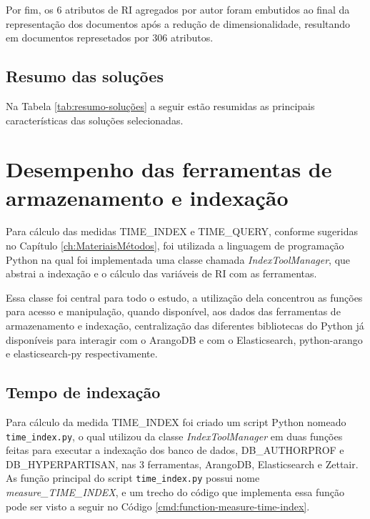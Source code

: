 				

				Por fim, os 6 atributos de RI agregados por autor foram embutidos ao final da representação dos documentos após a redução de dimensionalidade, resultando em documentos represetados por 306 atributos.


		\subsection{Resumo das soluções} \label{sec:ResumoDasSoluções}
			Na Tabela \ref{tab:resumo-soluções} a seguir estão resumidas as principais características das soluções selecionadas.

			

	\section{Desempenho das ferramentas de armazenamento e indexação} \label{sec:DesempenhoFerramentas}
		Para cálculo das medidas TIME\_INDEX e TIME\_QUERY, conforme sugeridas no Capítulo \ref{ch:MateriaisMétodos}, foi utilizada a linguagem de programação Python na qual foi implementada uma classe chamada \textit{IndexToolManager}, que abstrai a indexação e o cálculo das variáveis de RI com as ferramentas. 

		Essa classe foi central para todo o estudo, a utilização dela concentrou as funções para acesso e manipulação, quando disponível, aos dados das ferramentas de armazenamento e indexação, centralização das diferentes bibliotecas do Python já disponíveis para interagir com o ArangoDB e com o Elasticsearch, python-arango e elasticsearch-py respectivamente.
		\subsection{Tempo de indexação}
			Para cálculo da medida TIME\_INDEX foi criado um script Python nomeado \texttt{time\_index.py}, o qual utilizou da classe \textit{IndexToolManager} em duas funções feitas para executar a indexação dos banco de dados, DB\_AUTHORPROF e DB\_HYPERPARTISAN, nas 3 ferramentas, ArangoDB, Elasticsearch e Zettair.
			As função principal do script \texttt{time\_index.py} possui nome \textit{measure\_TIME\_INDEX}, e um trecho do código que implementa essa função pode ser visto a seguir no Código \ref{cmd:function-measure-time-index}.

